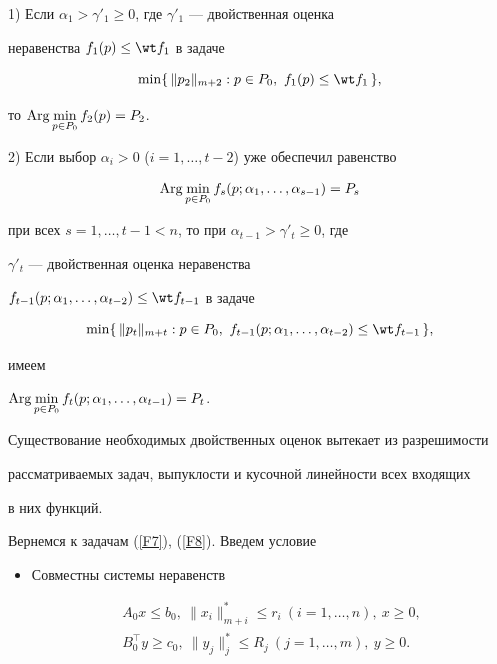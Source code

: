 1) Если $\alpha_1>\gamma'_1\ge 0$, где $\gamma'_1$ --- двойственная оценка


неравенства $f_1(p)\le \wt f_1$ в задаче


$$


\min\{\,\| p_2\|_{m+2}: p\in P_0,\ f_1(p)\le \wt f_1\, \},


$$


то $\operatorname{Arg}\min\limits_{p\in P_0} f_2(p)=P_2$.





2) Если выбор $\alpha_i>0$ ($i=1,\dotsc,t-2$) уже обеспечил равенство


$$


\Arg\min_{p\in P_0} f_s(p;\alpha_1,\dotsc,\alpha_{s-1})= P_s


$$


при всех $s=1,\dotsc,t-1<n$, то при $\alpha_{t-1}>\gamma'_t\ge 0$, где


$\gamma'_t$ --- двойственная оценка неравенства


$f_{t-1} (p;\alpha_1, \dotsc,\alpha_{t-2}) \le\wt f_{t-1}$ в задаче


$$


\min\{\, \| p_t\|_{m+t}: p\in P_0,\ f_{t-1}(p;\alpha_1,\dotsc,


\alpha_{t-2})\le \wt f_{t-1}\, \},


$$


имеем


$\operatorname{Arg}\min\limits_{p\in P_0}f_t(p;\alpha_1,\dotsc,\alpha_{t-1})=P_t$.





Существование необходимых двойственных оценок вытекает из разрешимости


рассматриваемых задач, выпуклости и кусочной линейности всех входящих


в них функций.





Вернемся к задачам (\ref{F7}), (\ref{F8}). Введем условие


\begin{itemize}


\item[B3.] Совместны системы неравенств


\begin{gather*}


A_0x\le b_0,\ \|x_i\|^*_{m+i}\le r_i\ (i=1,\dotsc,n),\ x\ge 0,\\


%


B_0^{\top}y \ge c_0,\ \|y_j\|^*_j \le R_j\ (j=1,\dotsc,m ),\ y\ge 0.


\end{gather*}


\end{itemize}





